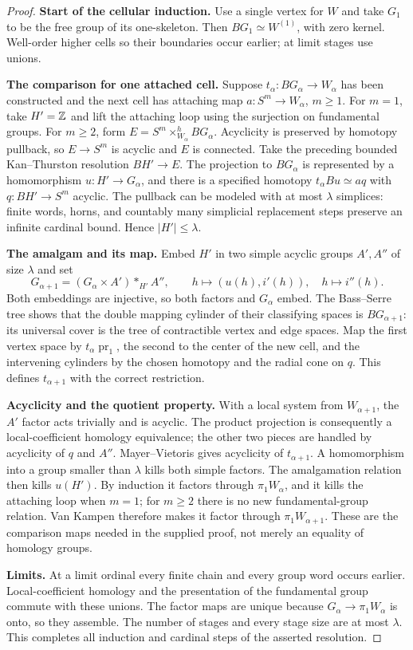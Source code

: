 \begin{proof}
\textbf{Start of the cellular induction.} Use a single vertex for $W$
and take $G_1$ to be the free group of its one-skeleton. Then
$BG_1\simeq W^{(1)}$, with zero kernel. Well-order higher cells so their
boundaries occur earlier; at limit stages use unions.

\textbf{The comparison for one attached cell.} Suppose $t_\alpha:BG_\alpha
\to W_\alpha$ has been constructed and the next cell has attaching map
$a:S^m\to W_\alpha$, $m\geq1$. For $m=1$, take $H'=\mathbb Z$ and lift the
attaching loop using the surjection on fundamental groups. For $m\geq2$,
form $E=S^m\times^h_{W_\alpha}BG_\alpha$. Acyclicity is preserved by
homotopy pullback, so $E\to S^m$ is acyclic and $E$ is connected.
Take the preceding bounded Kan--Thurston resolution $BH'\to E$.
The projection to $BG_\alpha$ is represented by a homomorphism
$u:H'\to G_\alpha$, and there is a specified homotopy
$t_\alpha Bu\simeq aq$ with $q:BH'\to S^m$ acyclic. The pullback can be
modeled with at most $\lambda$ simplices: finite words, horns, and
countably many simplicial replacement steps preserve an infinite
cardinal bound. Hence $|H'|\leq\lambda$.

\textbf{The amalgam and its map.} Embed $H'$ in two simple acyclic
groups $A',A''$ of size $\lambda$ and set
\[
 G_{\alpha+1}=(G_\alpha\times A')*_{H'}A'',
 \qquad h\longmapsto(u(h),i'(h)),\quad h\longmapsto i''(h).
\]
Both embeddings are injective, so both factors and $G_\alpha$ embed.
The Bass--Serre tree shows that the double mapping cylinder of their
classifying spaces is $BG_{\alpha+1}$: its universal cover is the tree
of contractible vertex and edge spaces. Map the first vertex space by
$t_\alpha\operatorname{pr}_1$, the second to the center of the new cell,
and the intervening cylinders by the chosen homotopy and the radial
cone on $q$. This defines $t_{\alpha+1}$ with the correct restriction.

\textbf{Acyclicity and the quotient property.} With a local system from
$W_{\alpha+1}$, the $A'$ factor acts trivially and is acyclic. The product
projection is consequently a local-coefficient homology equivalence;
the other two pieces are handled by acyclicity of $q$ and $A''$.
Mayer--Vietoris gives acyclicity of $t_{\alpha+1}$. A homomorphism into a
group smaller than $\lambda$ kills both simple factors. The amalgamation
relation then kills $u(H')$. By induction it factors through
$\pi_1W_\alpha$, and it kills the attaching loop when $m=1$; for $m\geq2$
there is no new fundamental-group relation. Van Kampen therefore makes
it factor through $\pi_1W_{\alpha+1}$. These are the comparison maps
needed in the supplied proof, not merely an equality of homology groups.

\textbf{Limits.} At a limit ordinal every finite chain and every group
word occurs earlier. Local-coefficient homology and the presentation of
the fundamental group commute with these unions. The factor maps are
unique because $G_\alpha\to\pi_1W_\alpha$ is onto, so they assemble.
The number of stages and every stage size are at most $\lambda$.
This completes all induction and cardinal steps of the asserted resolution.
\end{proof}

